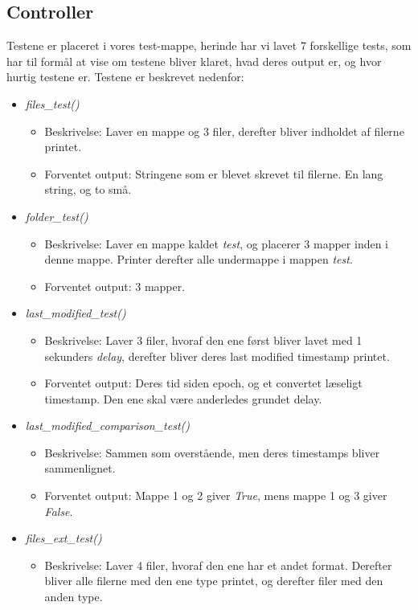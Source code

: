 \documentclass[11pt]{article}
\begin{document}
\subsection{Controller}
Testene er placeret i vores test-mappe, herinde har vi lavet 7 forskellige tests, som har til formål at vise om testene bliver klaret, hvad deres output er, og hvor hurtig testene er. Testene er beskrevet nedenfor:
\begin{itemize}
\item \textit{files\_test()}
  \begin{itemize}
  \item Beskrivelse: Laver en mappe og 3 filer, derefter bliver indholdet af filerne printet.
  \item Forventet output: Stringene som er blevet skrevet til filerne. En lang string, og to små.
  \end{itemize}
\item \textit{folder\_test()}
  \begin{itemize}
  \item Beskrivelse: Laver en mappe kaldet \textit{test}, og placerer 3 mapper inden i denne mappe. Printer derefter alle undermappe i mappen \textit{test}.
  \item Forventet output: 3 mapper.
  \end{itemize}
\item \textit{last\_modified\_test()}
  \begin{itemize}
  \item Beskrivelse: Laver 3 filer, hvoraf den ene først bliver lavet med 1 sekunders \textit{delay}, derefter bliver deres last modified timestamp printet.
  \item Forventet output: Deres tid siden epoch, og et convertet læseligt timestamp. Den ene skal være anderledes grundet delay.
  \end{itemize}
\item \textit{last\_modified\_comparison\_test()}
  \begin{itemize}
  \item Beskrivelse: Sammen som overstående, men deres timestamps bliver sammenlignet.
  \item Forventet output: Mappe 1 og 2 giver \textit{True}, mens mappe 1 og 3 giver \textit{False}.
  \end{itemize}
\item \textit{files\_ext\_test()}
  \begin{itemize}
  \item Beskrivelse: Laver 4 filer, hvoraf den ene har et andet format. Derefter bliver alle filerne med den ene type printet, og derefter filer med den anden type.

\end{itemize}
\end{itemize}
\end{document}
